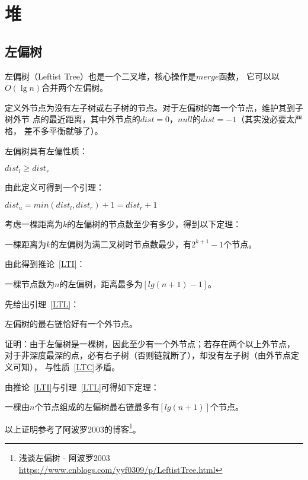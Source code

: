 \section{堆}
\subsection{左偏树}
左偏树（Leftist Tree）也是一个二叉堆，核心操作是$merge$函数，
它可以以$O(\lg n)$合并两个左偏树。

定义外节点为没有左子树或右子树的节点。对于左偏树的每一个节点，维护其到子树外节
点的最近距离，其中外节点的$dist=0$，$null$的$dist=-1$（其实没必要太严格，
差不多平衡就够了）。

左偏树具有左偏性质：
\begin{character}\label{LTC}
    $dist_l \geq dist_r$
\end{character}

由此定义可得到一个引理：

\begin{lemma}
    $dist_u=min(dist_l,dist_r)+1=dist_r+1$
\end{lemma}

考虑一棵距离为$k$的左偏树的节点数至少有多少，得到以下定理：

\begin{theorem}
    一棵距离为$k$的左偏树为满二叉树时节点数最少，有$2^{k+1}-1$个节点。
\end{theorem}

由此得到推论~\ref{LTI}：

\begin{inference}\label{LTI}
    一棵节点数为$n$的左偏树，距离最多为$[lg(n+1)-1]$。
\end{inference}

先给出引理~\ref{LTL}：

\begin{lemma}\label{LTL}
    左偏树的最右链恰好有一个外节点。
\end{lemma}

证明：由于左偏树是一棵树，因此至少有一个外节点；若存在两个以上外节点，
对于非深度最深的点，必有右子树（否则链就断了），却没有左子树（由外节点定义可知），
与性质~\ref{LTC}矛盾。

由推论~\ref{LTI}与引理~\ref{LTL}可得如下定理：

\begin{theorem}\label{LTT}
    一棵由$n$个节点组成的左偏树最右链最多有$[lg(n+1)]$个节点。
\end{theorem}

以上证明参考了阿波罗2003的博客\footnote{
    浅谈左偏树 - 阿波罗2003
    \url{https://www.cnblogs.com/yyf0309/p/LeftistTree.html}
}。

